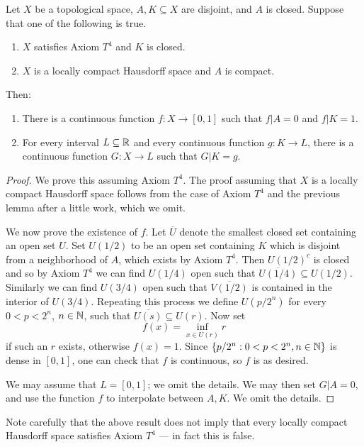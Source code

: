 \begin{theorem}\label{Urysohn and Tietze}
Let $X$ be a topological space, $A, K \subseteq X$ are disjoint, and $A$ is closed. Suppose that one of the following is true.
\begin{enumerate}
\item $X$ satisfies Axiom $T^4$ and $K$ is closed.
\item $X$ is a locally compact Hausdorff space and $A$ is compact.
\end{enumerate}
Then:
\begin{enumerate}
\item There is a continuous function $f: X \to [0, 1]$ such that $f|A = 0$ and $f|K = 1$.
\item For every interval $L \subseteq \mathbb{R}$ and every continuous function $g: K \to L$, there is a continuous function $G: X \to L$ such that $G|K = g$.
\end{enumerate}
\end{theorem}
\begin{proof}
We prove this assuming Axiom $T^4$. The proof assuming that $X$ is a locally compact Hausdorff space follows from the case of Axiom $T^4$ and the previous lemma after a little work, which we omit.

We now prove the existence of $f$.
Let $\overline U$ denote the smallest closed set containing an open set $U$.
Set $U(1/2)$ to be an open set containing $K$ which is disjoint from a neighborhood of $A$, which exists by Axiom $T^4$.
Then $U(1/2)^c$ is closed and so by Axiom $T^4$ we can find $U(1/4)$ open such that $\overline{U(1/4)} \subseteq U(1/2)$.
Similarly we can find $U(3/4)$ open such that $\overline{V(1/2)}$ is contained in the interior of $U(3/4)$.
Repeating this process we define $U(p/2^n)$ for every $0 < p < 2^n$, $n \in \mathbb{N}$, such that $\overline{U(s)} \subseteq U(r)$.
Now set
\[f(x) = \inf_{x \in U(r)} r\]
if such an $r$ exists, otherwise $f(x) = 1$.
Since $\{p/2^n: 0 < p < 2^n, n \in \mathbb{N}\}$ is dense in $[0, 1]$, one can check that $f$ is continuous, so $f$ is as desired.

We may assume that $L = [0, 1]$; we omit the details.
We may then set $G|A = 0$, and use the function $f$ to interpolate between $A,K$. We omit the details.
\end{proof}

\begin{subsec}
Note carefully that the above result does not imply that every locally compact Hausdorff space satisfies Axiom $T^4$ --- in fact this is false.
\end{subsec}

